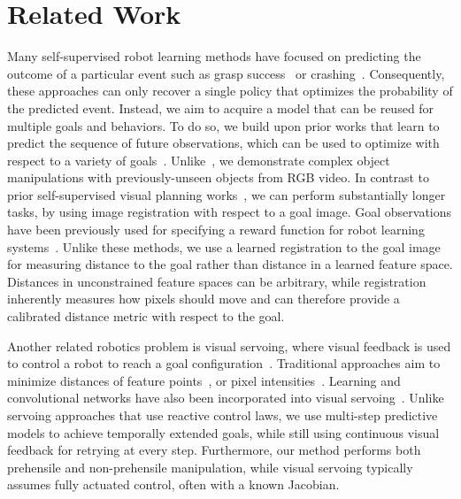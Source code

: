 \section{Related Work}


Many self-supervised robot learning methods have focused on predicting the outcome of a particular event such as grasp success~\cite{lerrel,google_handeye,princeton_pushgrasp} or crashing~\cite{crashing,greg_kahn_uncertainty}. Consequently, these approaches can only recover a single policy that optimizes the probability of the predicted event. Instead, we aim to acquire a model that can be reused for multiple goals and behaviors. To do so, we build upon prior works that learn to predict the sequence of future observations, which can be used to optimize with respect to a variety of goals~\cite{foresight,sna,se3_control}. Unlike~\citet{se3_control}, we demonstrate complex object manipulations with previously-unseen objects from RGB video. In contrast to prior self-supervised visual planning works~\cite{foresight,sna}, we can perform substantially longer tasks, by using image registration with respect to a goal image.
Goal observations have been previously used for specifying a reward function for robot learning systems~\cite{jagersand1995visual,deguchi1999image,e2c,dsae}. Unlike these methods, we use a learned registration to the goal image for measuring distance to the goal rather than distance in a learned feature space. Distances in unconstrained feature spaces can be arbitrary, while registration inherently measures how pixels should move and can therefore provide a calibrated distance metric with respect to the goal.





Another related robotics problem is visual servoing, where visual feedback is used to control a robot to reach a goal configuration~\cite{hutchinson1996tutorial,kragic2002survey,desouza2002survey}.
Traditional approaches aim to minimize distances of feature points~\cite{feddema1989vision,espiau1992servo,wilson1996relative}, or pixel intensities~\cite{caron2013photometric}. Learning and convolutional networks have also been incorporated into visual servoing~\cite{saxena2017servoing,bateux2018servoing,lee2017servoing,google_handeye}. Unlike servoing approaches that use reactive control laws, we use multi-step predictive models to achieve temporally extended goals, while still using continuous visual feedback for retrying at every step. Furthermore, our method performs both prehensile and non-prehensile manipulation, while visual servoing typically assumes fully actuated control, often with a known Jacobian.

